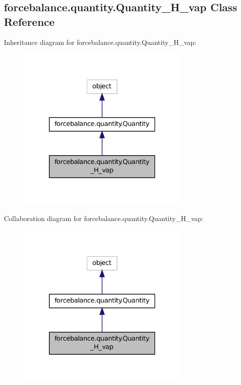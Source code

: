 \hypertarget{classforcebalance_1_1quantity_1_1Quantity__H__vap}{\subsection{forcebalance.\-quantity.\-Quantity\-\_\-\-H\-\_\-vap Class Reference}
\label{classforcebalance_1_1quantity_1_1Quantity__H__vap}
}


Inheritance diagram for forcebalance.\-quantity.\-Quantity\-\_\-\-H\-\_\-vap\-:
\nopagebreak
\begin{figure}[H]
\begin{center}
\leavevmode
\includegraphics[width=242pt]{classforcebalance_1_1quantity_1_1Quantity__H__vap__inherit__graph}
\end{center}
\end{figure}


Collaboration diagram for forcebalance.\-quantity.\-Quantity\-\_\-\-H\-\_\-vap\-:
\nopagebreak
\begin{figure}[H]
\begin{center}
\leavevmode
\includegraphics[width=242pt]{classforcebalance_1_1quantity_1_1Quantity__H__vap__coll__graph}
\end{center}
\end{figure}
